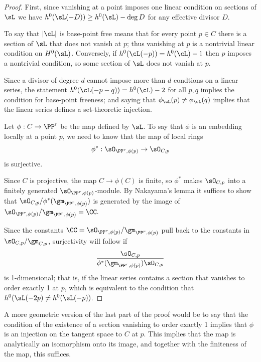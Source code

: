 \begin{proof}
First, since vanishing at a point imposes one linear condition on sections of $\sL$ we have $h^0(\sL(-D)) \geq h^0(\sL)-\deg D$ for any
effective divisor $D$.

To say that $|\cL|$ is base-point free means that for every point $p\in C$ there is a section of $\sL$ that does not vanish at $p$; thus vanishing
at $p$ is a nontrivial linear condition on $H^0(\sL)$. Conversely, if $h^0(\cL(-p)) = h^0(\cL) - 1$ then $p$ imposes a nontrivial condition, so
some section of $\sL$ does not vanish at $p$.

Since a divisor of degree $d$ cannot impose more than $d$ condtions on a linear series, the statement $h^0(\cL(-p-q)) = h^0(\cL) - 2$ for all $p, q$ implies the condition for base-point freeness; and saying that $\phi_\cL(p) \neq \phi_\cL(q)$ implies that the linear series defines a set-theoretic injection. 


Let $\phi:C \to \PP^r$ be the map defined by $\sL$. To say that $\phi$  is an embedding locally at a point $p$, we need to know that the map of local rings
$$
\phi^*: \sO_{\PP^r,\phi(p)} \to \sO_{C,p} 
$$
is surjective. 

Since $C$ is projective, the map $C\to \phi(C)$ is finite,
so $\phi^*$ makes $\sO_{C,p}$ into a finitely generated $\sO_{\PP^r,\phi(p)}$-module.
By Nakayama's lemma it suffices to show that 
$\sO_{C,p}/\phi^*(\gm_{\PP^r,\phi(p)})$
is generated by the image of $\sO_{\PP^r,\phi(p)}/\gm_{\PP^r,\phi(p)} = \CC.$

 Since the constants  $\CC =\sO_{\PP^r,\phi(p)}/\gm_{\PP^r,\phi(p)}$ pull back to the constants in
$\sO_{C,p}/\gm_{C,p}$,
surjectivity will follow if 
$$
\frac{\sO_{C,p}}
{\phi^*(\gm_{\PP^r,\phi(p)})  \sO_{C,p}}
$$
is 1-dimensional; that is, if the linear series contains
a section that vanishes to order exactly 1 at $p$, which is equivalent to the condition
that $h^0(\sL(-2p) \neq h^0(\sL(-p))$.
\end{proof}

A more geometric version of the last part of the proof would be to say that the condition of the existence of a section
vanishing to order exactly 1 implies that $\phi$ is an injection on the tangent space to $C$ at $p$. This implies that
the map is analytically an isomorphism onto its image, and together with the finiteness of the map, this suffices.


